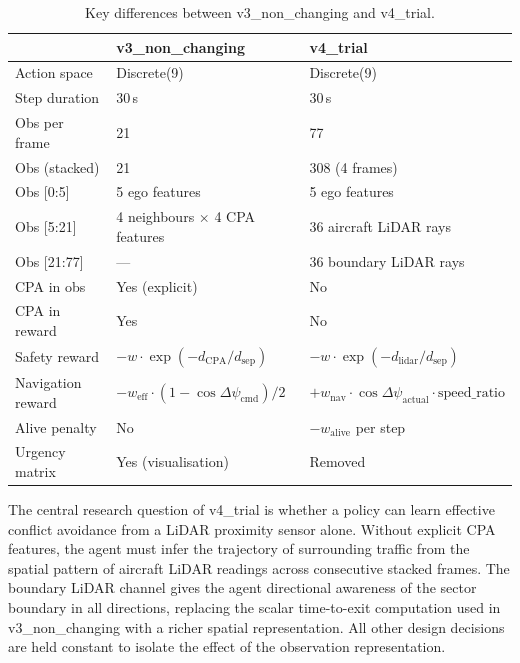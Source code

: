 \documentclass[11pt, a4paper]{article}
\begin{document}
\begin{table}[h]
\centering
\caption{Key differences between v3\_non\_changing and v4\_trial.}
\smallskip
\begin{tabular}{lll}
\toprule
& \textbf{v3\_non\_changing} & \textbf{v4\_trial} \\
\midrule
Action space         & Discrete(9)                      & Discrete(9) \\
Step duration        & 30\,s                            & 30\,s \\
Obs per frame        & 21                               & 77 \\
Obs (stacked)        & 21                               & 308 (4 frames) \\
Obs [0:5]            & 5 ego features                   & 5 ego features \\
Obs [5:21]           & 4 neighbours $\times$ 4 CPA features & 36 aircraft LiDAR rays \\
Obs [21:77]          & —                                & 36 boundary LiDAR rays \\
CPA in obs           & Yes (explicit)                   & No \\
CPA in reward        & Yes                              & No \\
Safety reward        & $-w\cdot\exp(-d_\text{CPA}/d_\text{sep})$  & $-w\cdot\exp(-d_\text{lidar}/d_\text{sep})$ \\
Navigation reward    & $-w_\text{eff}\cdot(1-\cos\Delta\psi_\text{cmd})/2$ & $+w_\text{nav}\cdot\cos\Delta\psi_\text{actual}\cdot\text{speed\_ratio}$ \\
Alive penalty        & No                               & $-w_\text{alive}$ per step \\
Urgency matrix       & Yes (visualisation)              & Removed \\
\bottomrule
\end{tabular}
\end{table}

The central research question of v4\_trial is whether a policy can learn
effective conflict avoidance from a LiDAR proximity sensor alone.
Without explicit CPA features, the agent must infer the trajectory of
surrounding traffic from the spatial pattern of aircraft LiDAR readings across
consecutive stacked frames.
The boundary LiDAR channel gives the agent directional awareness of the sector
boundary in all directions, replacing the scalar time-to-exit computation used
in v3\_non\_changing with a richer spatial representation.
All other design decisions are held constant to isolate the effect of the
observation representation.
\end{document}
